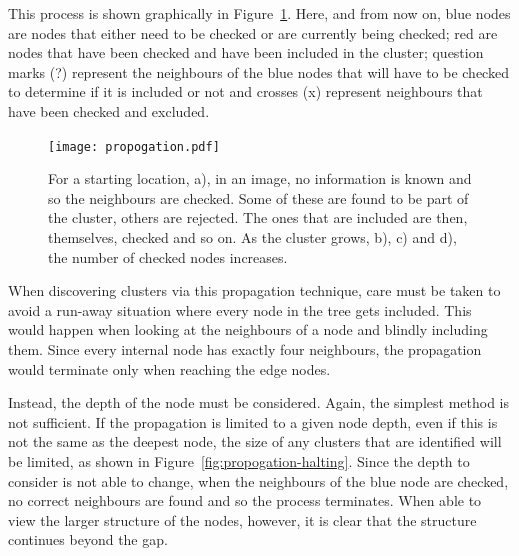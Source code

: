 This process is shown graphically in Figure~\ref{fig:propogation}. Here, and
from now on, blue nodes are nodes that either need to be checked or are
currently being checked; red are nodes that have been checked and have been
included in the cluster; question marks ({\footnotesize?}) represent the
neighbours of the blue nodes that will have to be checked to determine if it is
included or not and crosses ({\footnotesize x}) represent neighbours that have
been checked and excluded.

\begin{figure}[tbhp]
	\centering
	\texttt{[image: propogation.pdf]}
	\caption{For a starting location, a), in an image, no information is known
	and so the neighbours are checked. Some of these are found to be part of
	the cluster, others are rejected. The ones that are included are then,
	themselves, checked and so on. As the cluster grows, b), c) and d), the
	number of checked nodes increases.}
	\label{fig:propogation}
\end{figure}

When discovering clusters via this propagation technique, care must be taken to
avoid a run-away situation where every node in the tree gets included. This
would happen when looking at the neighbours of a node and blindly including
them. Since every internal node has exactly four neighbours, the propagation
would terminate only when reaching the edge nodes.

Instead, the depth of the node must be considered. Again, the simplest method
is not sufficient. If the propagation is limited to a given node depth, even if
this is not the same as the deepest node, the size of any clusters that are
identified will be limited, as shown in Figure~\ref{fig:propogation-halting}.
Since the depth to consider is not able to change, when the neighbours of the
blue node are checked, no correct neighbours are found and so the process
terminates. When able to view the larger structure of the nodes, however, it is
clear that the structure continues beyond the gap.




